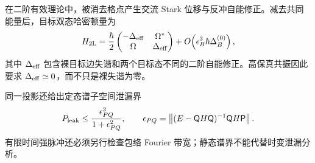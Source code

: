 在二阶有效理论中，被消去格点产生交流 Stark 位移与反冲自能修正。减去共同能量后，目标双态哈密顿量为
\begin{equation}
{
H_{2\rm L}
=\frac{\hbar}{2}
\begin{pmatrix}
-\Delta_{\rm eff}&\Omega^*\\
\Omega&\Delta_{\rm eff}
\end{pmatrix}
+O\!\left(\epsilon_B^3\hbar\Delta_B^{(0)}\right),}
\label{eq:recoil_effective_two_level}
\end{equation}
其中 $\Delta_{\rm eff}$ 包含裸目标边失谐和两个目标态不同的二阶自能修正。高保真共振因此要求 $\Delta_{\rm eff}\simeq0$，而不只是裸失谐为零。

同一投影还给出定态谱子空间泄漏界
\begin{equation}
{
P_{\rm leak}
\le\frac{\epsilon_{PQ}^2}{1+\epsilon_{PQ}^2},
\qquad
\epsilon_{PQ}
=\left\|(E-\mathsf QH\mathsf Q)^{-1}\mathsf QH\mathsf P\right\|.}
\label{eq:feshbach_stationary_leakage_bound}
\end{equation}
有限时间强脉冲还必须另行检查包络 Fourier 带宽；静态谱界不能代替时变泄漏分析。

